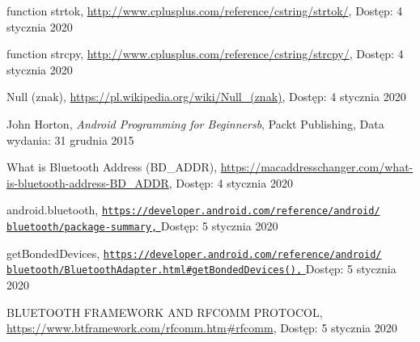 \documentclass[a4paper,12pt, twoside]{article}
\begin{document}
\begin{thebibliography}{}
    		function strtok,
    		\newline\url{http://www.cplusplus.com/reference/cstring/strtok/}, 
    		\newline Dostęp: 4 stycznia 2020
    		
    		function strcpy,
    		\newline\url{http://www.cplusplus.com/reference/cstring/strcpy/}, 
    		\newline Dostęp: 4 stycznia 2020
    		
    		Null (znak),
    		\newline\url{https://pl.wikipedia.org/wiki/Null_(znak)}, 
    		\newline Dostęp: 4 stycznia 2020
    		
    	    John Horton, \textit{Android Programming for Beginnersb}, Packt Publishing,
    		\newline Data wydania: 31 grudnia 2015
    		
    		What is Bluetooth Address (BD\_ADDR),
    		\newline\url{https://macaddresschanger.com/what-is-bluetooth-address-BD_ADDR}, 
    		\newline Dostęp: 4 stycznia 2020
    		
    		android.bluetooth,
    		\newline\href{https://developer.android.com/reference/android/bluetooth/}
    		 {\nolinkurl{https://developer.android.com/reference/android/}
                 \\
                  \nolinkurl{bluetooth/package-summary,}
                 }
    		\newline Dostęp: 5 stycznia 2020
    		
    		getBondedDevices,
    		\newline\href{https://developer.android.com/reference/android/bluetooth/BluetoothAdapter.html\#getBondedDevices()}
    		 {\nolinkurl{https://developer.android.com/reference/android/}
                 \\
                  \nolinkurl{bluetooth/BluetoothAdapter.html\#getBondedDevices(),}
                 }
    		\newline Dostęp: 5 stycznia 2020
    		
    		BLUETOOTH FRAMEWORK AND RFCOMM PROTOCOL,
    		\newline\url{https://www.btframework.com/rfcomm.htm#rfcomm}, 
    		\newline Dostęp: 5 stycznia 2020
    		

\end{thebibliography}
\end{document}
